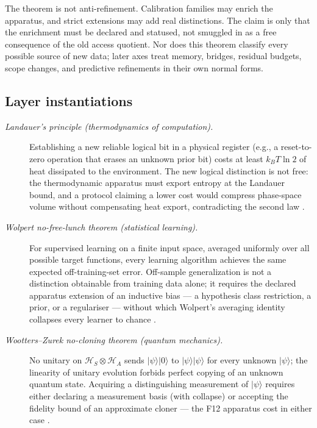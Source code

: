 \documentclass[11pt]{article}
\theoremstyle{definition}
\begin{document}
The theorem is not anti-refinement.  Calibration families may enrich
the apparatus, and strict extensions may add real distinctions.  The
claim is only that the enrichment must be declared and statused, not
smuggled in as a free consequence of the old access quotient.  Nor
does this theorem classify every possible source of new data; later
axes treat memory, bridges, residual budgets, scope changes, and
predictive refinements in their own normal forms.

\subsection*{Layer instantiations}\label{layer-inst:F12}

\begin{description}
\item[\emph{Landauer's principle (thermodynamics of computation).}]
Establishing a new reliable logical bit in a physical register
(e.g., a reset-to-zero operation that erases an unknown prior bit)
costs at least \(k_B T \ln 2\) of heat dissipated to the
environment.  The new logical distinction is not free: the
thermodynamic apparatus must export entropy at the Landauer bound,
and a protocol claiming a lower cost would compress phase-space
volume without compensating heat export, contradicting the second
law
\citep{Landauer1961IrreversibilityHeatGeneration}.

\item[\emph{Wolpert no-free-lunch theorem (statistical learning).}]
For supervised learning on a finite input space, averaged uniformly
over all possible target functions, every learning algorithm
achieves the same expected off-training-set error.  Off-sample
generalization is not a distinction obtainable from training data
alone; it requires the declared apparatus extension of an
inductive bias --- a hypothesis class restriction, a prior, or a
regulariser --- without which Wolpert's averaging identity collapses
every learner to chance
\citep{Wolpert1996NoFreeLunch}.

\item[\emph{Wootters--Zurek no-cloning theorem (quantum mechanics).}]
No unitary on \(\mathcal H_S\otimes\mathcal H_A\) sends
\(|\psi\rangle|0\rangle\) to \(|\psi\rangle|\psi\rangle\) for every
unknown \(|\psi\rangle\); the linearity of unitary evolution
forbids perfect copying of an unknown quantum state.  Acquiring a
distinguishing measurement of \(|\psi\rangle\) requires either
declaring a measurement basis (with collapse) or accepting the
fidelity bound of an approximate cloner --- the F12 apparatus
cost in either case
\citep{WoottersZurek1982NoCloning}.


\end{description}
\end{document}
